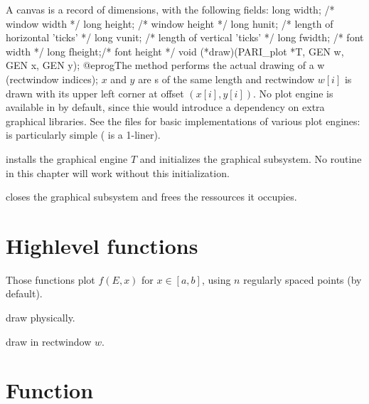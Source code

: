 A  canvas is a record of dimensions, with the following fields:
\bprog
  long width;  /* window width */
  long height; /* window height */
  long hunit;  /* length of horizontal 'ticks' */
  long vunit;  /* length of vertical 'ticks' */
  long fwidth; /* font width */
  long fheight;/* font height */
  void (*draw)(PARI_plot *T, GEN w, GEN x, GEN y);
@eprog\noindent The  method performs the actual drawing of
a  w (rectwindow indices); $x$ and $y$ are s
of the same length and rectwindow $w[i]$ is drawn with its upper left
corner at offset $(x[i],y[i])$. No plot engine is available in 
by default, since thie would introduce a dependency on extra graphical
libraries. See the files  for basic implementations of
various plot engines:  is particularly simple ( is a
1-liner).

 installs the
graphical engine $T$ and initializes the graphical subsystem. No routine in
this chapter will work without this initialization.

 closes the graphical subsystem and
frees the ressources it occupies.

\section{Highlevel functions}
Those functions plot $f(E,x)$ for $x\in [a,b]$, using $n$ regularly spaced
points (by default).

 draw physically.

 draw in rectwindow $w$.

\section{Function}






